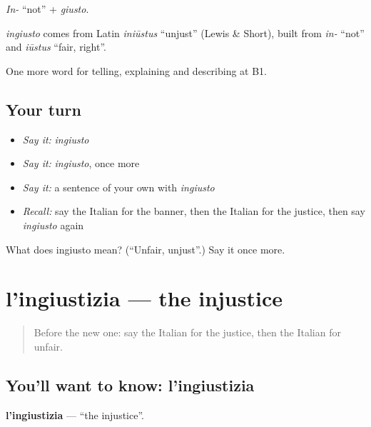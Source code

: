 \emph{In-} \textquotedblleft{}not\textquotedblright{} + \emph{giusto}.

\begin{cousinweb}
\emph{ingiusto} comes from Latin \emph{iniūstus} \textquotedblleft{}unjust\textquotedblright{} (Lewis \& Short), built from \emph{in-} \textquotedblleft{}not\textquotedblright{} and \emph{iūstus} \textquotedblleft{}fair, right\textquotedblright{}.
\end{cousinweb}

\begin{grammarlens}[title={What you've built}]
One more word for telling, explaining and describing at B1.
\end{grammarlens}

\subsection*{Your turn}
\begin{itemize}
\raggedright
  \item \emph{Say it:} \emph{ingiusto}
  \item \emph{Say it:} \emph{ingiusto}, once more
  \item \emph{Say it:} a sentence of your own with \emph{ingiusto}
  \item \emph{Recall:} say the Italian for the banner, then the Italian for the justice, then say \emph{ingiusto} again
\end{itemize}

\begin{tcolorbox}[breakable,colback=teal!4,colframe=teal!35!black,title={Before you move on}]
What does ingiusto mean? (\textquotedblleft{}Unfair, unjust\textquotedblright{}.) Say it once more.
\end{tcolorbox}
\section[l'ingiustizia]{l'ingiustizia — the injustice}

\label{lesson:IT-C365-ingiustizia}



\begin{quote}
Before the new one: say the Italian for the justice, then the Italian for unfair.
\end{quote}

\subsection*{You'll want to know: l'ingiustizia}
\textbf{l'ingiustizia} — \textquotedblleft{}the injustice\textquotedblright{}.

